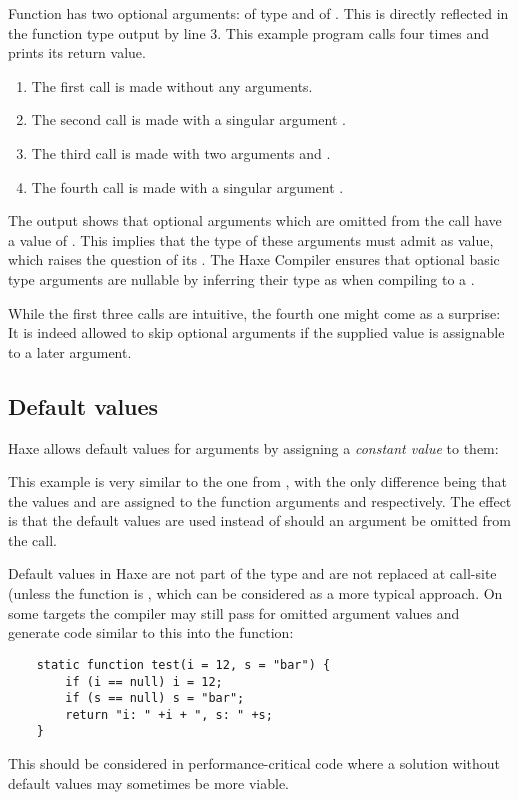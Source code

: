 {
Function  has two optional arguments:  of type  and  of . This is directly reflected in the function type output by line 3. 
This example program calls  four times and prints its return value.

\begin{enumerate}
	\item The first call is made without any arguments.
	\item The second call is made with a singular argument .
	\item The third call is made with two arguments  and .
	\item The fourth call is made with a singular argument .
\end{enumerate}
The output shows that optional arguments which are omitted from the call have a value of . This implies that the type of these arguments must admit  as value, which raises the question of its . The Haxe Compiler ensures that optional basic type arguments are nullable by inferring their type as  when compiling to a .

While the first three calls are intuitive, the fourth one might come as a surprise: It is indeed allowed to skip optional arguments if the supplied value is assignable to a later argument.


\subsection{Default values}
\label{types-function-default-values}

Haxe allows default values for arguments by assigning a \emph{constant value} to them:

This example is very similar to the one from , with the only difference being that the values  and  are assigned to the function arguments  and  respectively. The effect is that the default values are used instead of  should an argument be omitted from the call.


Default values in Haxe are not part of the type and are not replaced at call-site (unless the function is , which can be considered as a more typical approach. On some targets the compiler may still pass  for omitted argument values and generate code similar to this into the function:
\begin{lstlisting}
	static function test(i = 12, s = "bar") {
		if (i == null) i = 12;
		if (s == null) s = "bar";
		return "i: " +i + ", s: " +s;
	}
\end{lstlisting}
This should be considered in performance-critical code where a solution without default values may sometimes be more viable.




}
